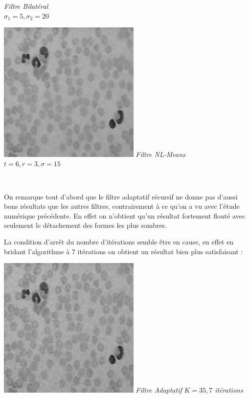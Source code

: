 \documentclass[a4,12pt]{article}
\begin{document}
\begin{center}
\begin{minipage}[c]{0.45\linewidth}
\begin{center}
			\textit{Filtre Bilatéral}\\
			\textit{$\sigma_1 =5 , \sigma_2=20$}\\
		\end{center}
	\end{minipage}
	\begin{minipage}[c]{0.45\linewidth}
		\begin{center}
			\includegraphics[width = 70mm]{./img/globNLMeans.jpg}
			\textit{Filtre NL-Means}\\
			\textit{$t = 6, r= 3, \sigma=15$}\\
		\end{center}
	\end{minipage}\\
\end{center}


On remarque tout d'abord que le filtre adaptatif récursif ne donne pas d'aussi bons résultats que les autres filtres, contrairement à ce qu'on a vu avec l'étude numérique précédente. En effet on n'obtient qu'un résultat fortement flouté avec seulement le détachement des formes les plus sombres.

La condition d'arrêt du nombre d'itérations semble être en cause, en effet en bridant l'algorithme à 7 itérations on obtient un résultat bien plus satisfaisant :\\

\noindent
\begin{center}
	\begin{minipage}[c]{0.45\linewidth}
		\begin{center}
			\includegraphics[width = 70mm]{./img/globAdaptMoinsInt.jpg}
			\textit{Filtre Adaptatif}
			\textit{$K = 35, 7$ itérations}\
		\end{center}
	\end{minipage}
\end{center}
\end{document}

